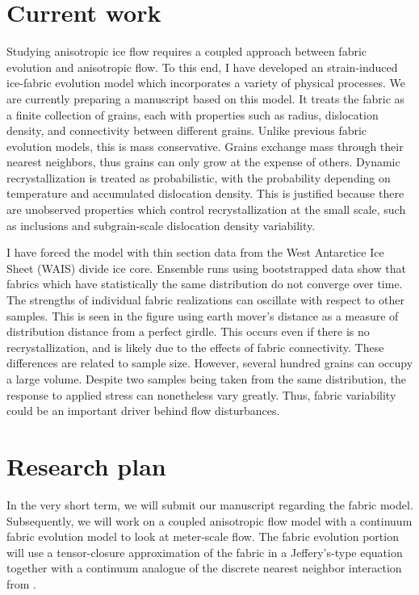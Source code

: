 \documentclass{article}
\begin{document}
\section{Current work}
Studying anisotropic ice flow requires a coupled approach between fabric evolution and anisotropic flow. To this end, I have developed an strain-induced ice-fabric evolution model which incorporates a variety of physical processes. We are currently preparing a manuscript based on this model. It treats the fabric as a finite collection of grains, each with properties such as radius, dislocation density, and connectivity between different grains. Unlike previous fabric evolution models, this is mass conservative. Grains exchange mass through their nearest neighbors, thus grains can only grow at the expense of others. Dynamic recrystallization is treated as probabilistic, with the probability depending on temperature and accumulated dislocation density. This is justified because there are unobserved properties which control recrystallization at the small scale, such as inclusions and subgrain-scale dislocation density variability.

I have forced the model with thin section data from the West Antarctice Ice Sheet (WAIS) divide ice core. Ensemble runs using bootstrapped data show that fabrics which have statistically the same distribution do not converge over time. The strengths of individual fabric realizations can oscillate with respect to other samples. This is seen in the figure using earth mover's distance as a measure of distribution distance from a perfect girdle. This occurs even if there is no recrystallization, and is likely due to the effects of fabric connectivity. These differences are related to sample size. However, several hundred grains can occupy a large volume. Despite two samples being taken from the same distribution, the response to applied stress can nonetheless vary greatly. Thus, fabric variability could be an important driver behind flow disturbances. 

\section{Research plan}
In the very short term, we will submit our manuscript regarding the fabric model. Subsequently, we will work on a coupled anisotropic flow model with a continuum fabric evolution model to look at meter-scale flow. The fabric evolution portion will use a tensor-closure approximation of the fabric in a Jeffery's-type equation \citep{jeffery1922} together with a continuum analogue of the discrete nearest neighbor interaction from \citet{throstur2002}.
\end{document}
